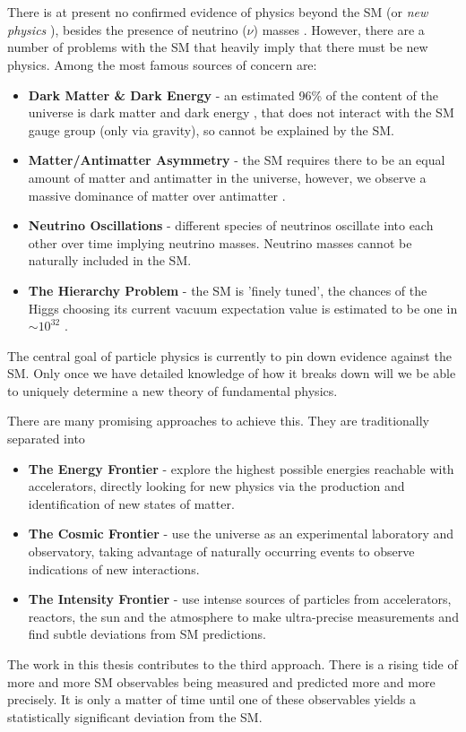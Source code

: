 \\ \\
There is at present no confirmed evidence of physics beyond the SM (or {\it{new physics}} ), besides the presence of neutrino ($\nu$) masses \cite{GONZALEZGARCIA20081}. However, there are a number of problems with the SM that heavily imply that there must be new physics. Among the most famous sources of concern are:
\begin{itemize}
\item
  {\bf{Dark Matter \& Dark Energy}} - an estimated 96\% of the content of the universe is dark matter \cite{Freese:2008cz} and dark energy \cite{Riess:1998cb,Perlmutter:1998np}, that does not interact with the SM gauge group (only via gravity), so cannot be explained by the SM.
\item
  {\bf{Matter/Antimatter Asymmetry}} - the SM requires there to be an equal amount of matter and antimatter in the universe, however, we observe a massive dominance of matter over antimatter \cite{Canetti:2012zc}.
\item
  {\bf{Neutrino Oscillations}} - different species of neutrinos oscillate into each other over time implying neutrino masses. Neutrino masses cannot be naturally included in the SM.
\item
  {\bf{The Hierarchy Problem}} - the SM is 'finely tuned', the chances of the Higgs choosing its current vacuum expectation value is estimated to be one in $\sim 10^{32}$ \cite{Wilson:1970ag,PhysRevD.14.1667,PhysRevD.13.3333}.
\end{itemize}

The central goal of particle physics is currently to pin down evidence against the SM. Only once we have detailed knowledge of how it breaks down will we be able to uniquely determine a new theory of fundamental physics.

There are many promising approaches to achieve this. They are traditionally separated into
\begin{itemize}
\item
  {\bf{The Energy Frontier}} - explore the highest possible energies reachable with accelerators, directly looking for new physics via the production and identification of new states of matter.
\item
  {\bf{The Cosmic Frontier}} - use the universe as an experimental laboratory and observatory,  taking advantage of naturally occurring events to observe indications of new interactions.
\item
  {\bf{The Intensity Frontier}} - use intense sources of particles from accelerators, reactors, the sun and the atmosphere to make ultra-precise measurements and find subtle deviations from SM predictions.
\end{itemize}
The work in this thesis contributes to the third approach. There is a rising tide of more and more SM observables being measured and predicted more and more precisely. It is only a matter of time until one of these observables yields a statistically significant deviation from the SM.

